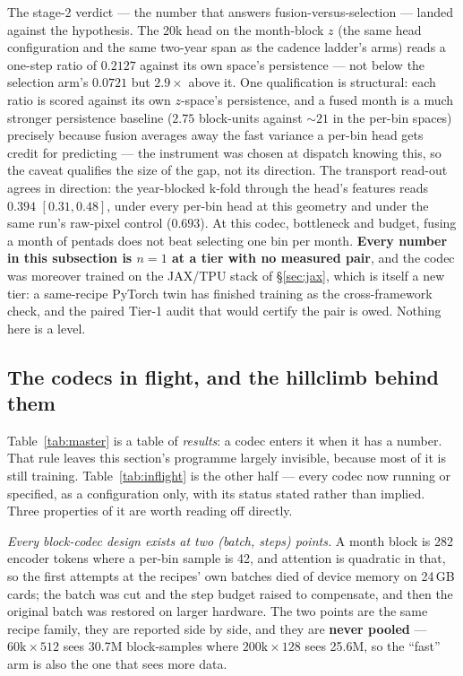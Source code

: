 \documentclass[10pt]{article}
\begin{document}
The stage-2 verdict --- the number that answers fusion-versus-selection ---
landed against the hypothesis. The 20k head on the month-block $z$ (the
same head configuration and the same two-year span as the cadence ladder's
arms) reads a one-step ratio of $0.2127$ against its own space's
persistence --- not below the selection arm's $0.0721$ but $2.9\times$
above it. One qualification is structural: each ratio is scored against
its own $z$-space's persistence, and a fused month is a much stronger
persistence baseline ($2.75$ block-units against ${\sim}21$ in the per-bin
spaces) precisely because fusion averages away the fast variance a per-bin
head gets credit for predicting --- the instrument was chosen at dispatch
knowing this, so the caveat qualifies the size of the gap, not its
direction. The transport read-out agrees in direction: the year-blocked
k-fold through the head's features reads $0.394$ $[0.31, 0.48]$, under
every per-bin head at this geometry and under the same run's raw-pixel
control ($0.693$). At this codec, bottleneck and budget, fusing a month of
pentads does not beat selecting one bin per month.
\textbf{Every number in this subsection is $n=1$
at a tier with no measured pair}, and the codec was moreover trained on the
JAX/TPU stack of \S\ref{sec:jax}, which is itself a new tier: a
same-recipe PyTorch twin has finished training as the cross-framework
check, and the paired Tier-1 audit that would certify the pair is owed.
Nothing here is a level.

\subsection{The codecs in flight, and the hillclimb behind
them}\label{sec:inflight}

Table~\ref{tab:master} is a table of \emph{results}: a codec enters it when it
has a number. That rule leaves this section's programme largely invisible,
because most of it is still training. Table~\ref{tab:inflight} is the other
half --- every codec now running or specified, as a configuration only, with
its status stated rather than implied. Three properties of it are worth
reading off directly.

\emph{Every block-codec design exists at two (batch, steps) points.} A month
block is 282 encoder tokens where a per-bin sample is 42, and attention is
quadratic in that, so the first attempts at the recipes' own batches died of
device memory on 24\,GB cards; the batch was cut and the step budget raised to
compensate, and then the original batch was restored on larger hardware. The
two points are the same recipe family, they are reported side by side, and
they are \textbf{never pooled} --- $60\mathrm{k}\times512$ sees
30.7M block-samples where $200\mathrm{k}\times128$ sees 25.6M, so the ``fast''
arm is also the one that sees more data.
\end{document}
